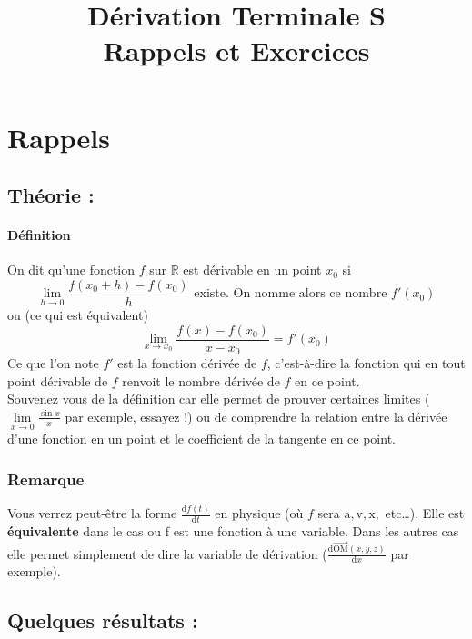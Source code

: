 \documentclass[11pt]{article}
\title{Dérivation Terminale S\\
        \large Rappels et Exercices}
\date{}
\author{}
\newcommand{\R}{\mathbb R}
\begin{document}
    
    \maketitle
    
    \section{Rappels}
        
        \subsection{Théorie :}
        
        \paragraph{Définition}
        On dit qu'une fonction $f$ sur $\R$ est dérivable en un point $x_0$ si
        \begin{equation}
            \lim\limits_{h \to 0} \frac{f(x_0 + h)-f(x_0)}{h} \text{ existe. On nomme alors ce nombre $f'(x_0)$} 
        \end{equation}
        ou (ce qui est équivalent)
        \begin{equation*}
            \lim\limits_{x \to x_0} \frac{f(x)-f(x_0)}{x-x_0} = f'(x_0)            
        \end{equation*}
        Ce que l'on note $f'$ est la fonction dérivée de $f$, c'est-à-dire la fonction qui en tout point dérivable de $f$ renvoit le nombre dérivée de $f$ en ce point.\\
        Souvenez vous de la définition car elle permet de prouver certaines limites ($\lim\limits_{x \to 0} \frac{\sin{x}}{x}$ par exemple, essayez !) ou de comprendre la relation entre la dérivée d'une fonction en un point et le coefficient de la tangente en ce point.
        \subsubsection*{Remarque}
        Vous verrez peut-être la forme $\frac{\mathrm{d}f(t)}{\mathrm{d}t}$ en physique (où $f$ sera $\mathrm{a}, \mathrm{v}, \mathrm{x},$ etc\dots). Elle est \textbf{équivalente} dans le cas ou f est une fonction à une variable. Dans les autres cas elle permet simplement de dire la variable de dérivation ($\frac{\mathrm{d}\overrightarrow{\mathrm{OM}}(x,y,z)}{\mathrm{d}x}$ par exemple). 

        \subsection{Quelques résultats :}
\end{document}
